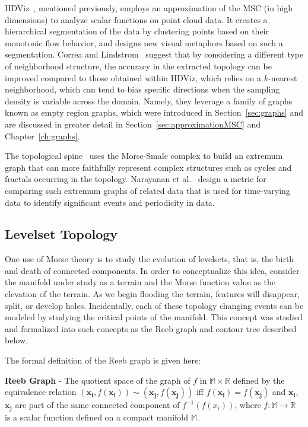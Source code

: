 HDViz~\cite{GerberBremerPascucci2010}, mentioned previously, employs an approximation of the MSC (in high dimensions) to analyze scalar functions on point cloud data.
%
It creates a hierarchical segmentation of the data by clustering points based on their monotonic flow behavior, and designs new visual metaphors based on such a segmentation.
%
Correa and Lindstrom~\cite{CorreaLindstrom2011} suggest that by considering a different type of neighborhood structure, the accuracy in the extracted topology can be improved compared to those obtained within HDViz, which relies on a $k$-nearest neighborhood, which can tend to bias specific directions when the sampling density is variable across the domain.
%
Namely, they leverage a family of graphs known as empty region graphs, which were introduced in Section~\ref{sec:graphs} and are discussed in greater detail in Section~\ref{sec:approximationMSC} and Chapter~\ref{ch:graphs}.
%

The topological spine~\cite{CorreaLindstromBremer2011} uses the Morse-Smale complex to build an extremum graph that can more faithfully represent complex structures such as cycles and fractals occurring in the topology.
%
Narayanan et al.~\cite{NarayananThomasNatarajan2015} design a metric for comparing such extremum graphs of related data that is used for time-varying data to identify significant events and periodicity in data.

\subsection{Levelset Topology}

One use of Morse theory is to study the evolution of levelsets, that is, the birth and death of connected components.
%
In order to conceptualize this idea, consider the manifold under study as a terrain and the Morse function value as the elevation of the terrain.
%
As we begin flooding the terrain, features will disappear, split, or develop holes.
%
Incidentally, each of these topology changing events can be modeled by studying the critical points of the manifold.
%
This concept was studied and formalized into such concepts as the Reeb graph and contour tree described below.

The formal definition of the Reeb graph is given here:

\begin{defn}
\textbf{Reeb Graph} - The quotient space of the graph of $f$ in
$\mathbb{M} \times \mathbb{R}$ defined by the equivalence relation
$(\mathbf{x_i},f(\mathbf{x_i})) \sim (\mathbf{x_j},f(\mathbf{x_j}))$ iff
$f(\mathbf{x_i}) = f(\mathbf{x_j})$ and $\mathbf{x_i}$,$\mathbf{x_j}$ are part
of the same connected component of $f^{-1}(f(x_i))$, where $f : \mathbb{M} \rightarrow \mathbb{R}$ is a scalar function defined on a compact manifold $\mathbb{M}$.
\end{defn}

